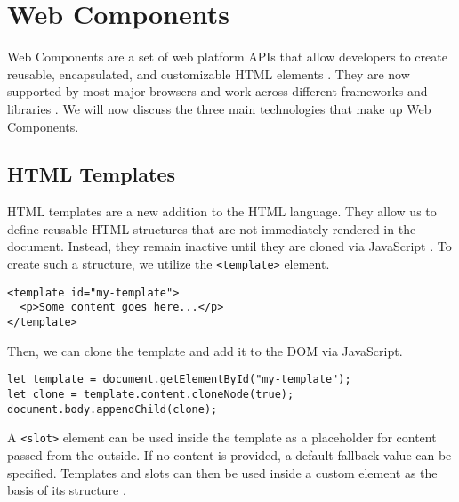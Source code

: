 \section{Web Components}
Web Components are a set of web platform APIs that allow developers to create reusable, encapsulated, and customizable HTML elements \cite{MDNWebComponents}. They are now supported by most major browsers and work across different frameworks and libraries \cite{EisenbergWebComponents}. We will now discuss the three main technologies that make up Web Components.

\subsection{HTML Templates}
HTML templates are a new addition to the HTML language. They allow us to define reusable HTML structures that are not immediately rendered in the document. Instead, they remain inactive until they are cloned via JavaScript \cite{MDNWebComponents}. To create such a structure, we utilize the \texttt{<template>} element.
\begin{verbatim}
<template id="my-template">
  <p>Some content goes here...</p>
</template>
\end{verbatim}
Then, we can clone the template and add it to the DOM via JavaScript.
\begin{verbatim}
let template = document.getElementById("my-template");
let clone = template.content.cloneNode(true);
document.body.appendChild(clone);
\end{verbatim}
A \texttt{<slot>} element can be used inside the template as a placeholder for content passed from the outside. If no content is provided, a default fallback value can be specified. Templates and slots can then be used inside a custom element as the basis of its structure \cite{MDNWebComponents}. 


